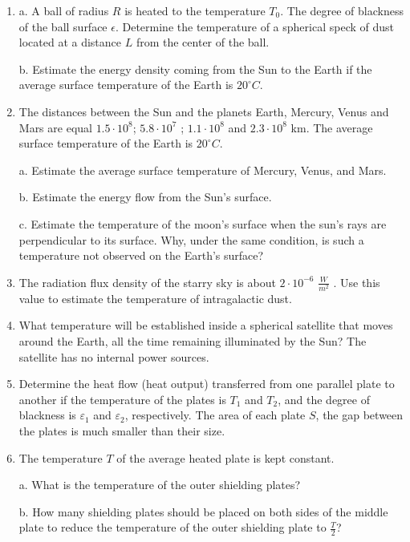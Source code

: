 \documentclass{article}
\begin{document}
\begin{enumerate}[label=5.11.\arabic*]
\item a. A ball of radius $R$ is heated to the temperature $T_0$. The degree of blackness of the ball surface $\epsilon$. Determine the temperature of a spherical speck of dust located at a distance $L$ from the center of the ball. 

b. Estimate the energy density coming from the Sun to the Earth if the average surface temperature of the Earth is $20^\circ C$.

\item The distances between the Sun and the planets Earth, Mercury, Venus and Mars are equal $1.5 \cdot 10^8$; $5.8 \cdot 10^7$ ; $1.1 \cdot 10^8$ and $2.3 \cdot 10^8$ km. The average surface temperature of the Earth is $20^\circ C$.

a. Estimate the average surface temperature of Mercury, Venus, and Mars. 

b. Estimate the energy flow from the Sun's surface.

c. Estimate the temperature of the moon's surface when the sun's rays are perpendicular to its surface. Why, under the same condition, is such a temperature not observed on the Earth's surface?

\item The radiation flux density of the starry sky is about $2 \cdot 10^{-6}$ $\frac{W}{m^2}$ . Use this value to estimate the temperature of intragalactic dust.

\item What temperature will be established inside a spherical satellite that moves around the Earth, all the time remaining illuminated by the Sun? The satellite has no internal power sources.

\item Determine the heat flow (heat output) transferred from one parallel plate to another if the temperature of the plates is $T_1$ and $T_2$, and the degree of blackness is $\varepsilon_1$ and $\varepsilon_2$, respectively. The area of each plate $S$, the gap between the plates is much smaller than their size.

\item The temperature $T$ of the average heated plate is kept constant. 

a. What is the temperature of the outer shielding plates? 

b. How many shielding plates should be placed on both sides of the middle plate to reduce the temperature of the outer shielding plate to $\frac{T}{2}$?




\end{enumerate}
\end{document}
